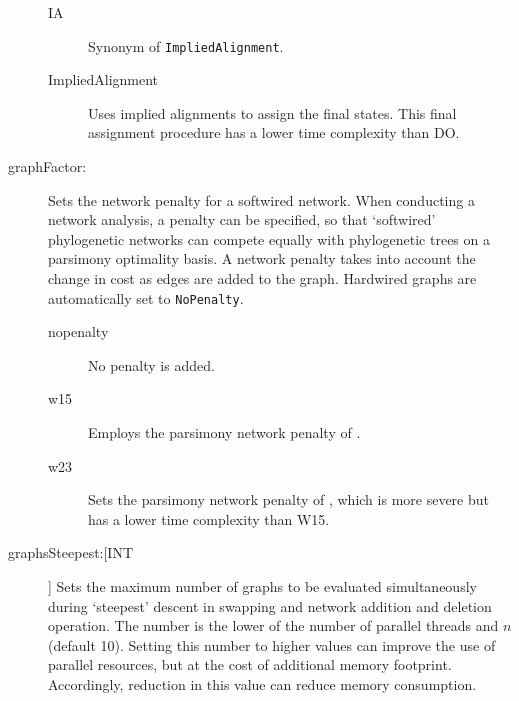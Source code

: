 \begin{description}
\begin{description}
			\item[IA] Synonym of \texttt{ImpliedAlignment}.
			
			\item[ImpliedAlignment] Uses implied alignments
			to assign the final states.  This final assignment procedure has a lower time complexity than DO.
			\end{description}
			
			
		\item[graphFactor:] Sets the network penalty for a softwired network. When conducting 
		a network analysis, a penalty can be specified, so that ‘softwired’ phylogenetic networks 
		can compete equally with phylogenetic trees on a parsimony optimality basis. A network 
		penalty takes into account the change in cost as edges are added to the graph. Hardwired 
		graphs are automatically set to \texttt{NoPenalty}.
			
			\begin{description}
			\item[nopenalty] No penalty is added.	

			\item[w15] Employs the parsimony network penalty of \cite{Wheeler2015}.	
		
			\item[w23] Sets the parsimony network penalty of \cite{WheelerandWashburn2023}, 
			which is more severe but has a lower time complexity than W15.		

			\end{description}
			
			
		\item[graphsSteepest:[INT]] Sets the maximum number of graphs to be evaluated 
		simultaneously during `steepest' descent in swapping and network addition and 
		deletion operation. The number is the lower of the number of parallel threads 
		and $n$ (default 10).  Setting this number to higher values can improve the use of 
		parallel resources, but at the cost of additional memory footprint.  Accordingly, 
		reduction in this value can reduce memory consumption.
			

\end{description}
